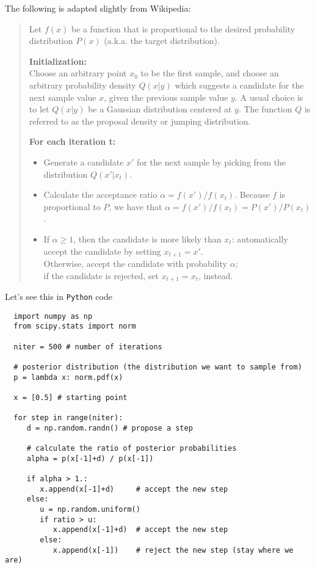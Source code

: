 \documentclass[a4paper,11pt]{article}
\begin{document}
\noindent The following is adapted slightly from Wikipedia:

\begin{quote}
   Let $f(x)$ be a function that is proportional to the desired probability distribution $P(x)$ (a.k.a. the target distribution).

    \textbf{Initialization:}\\
    Choose an arbitrary point $x_0$ to be the first sample, and choose an arbitrary probability density $Q(x|y)$ which suggests a candidate for the next sample value $x$, given the previous sample value $y$. A usual choice is to let $Q(x|y)$ be a Gaussian distribution centered at $y$. The function $Q$ is referred to as the proposal density or jumping distribution.

    \textbf{For each iteration t:}
    \begin{itemize}
      \item Generate a candidate $x'$ for the next sample by picking from the distribution $Q(x'|x_t)$.
      \item Calculate the acceptance ratio $\alpha = f(x')/f(x_t)$. Because $f$ is proportional to $P$, we have that $\alpha = f(x')/f(x_t) = P(x')/P(x_t)$.
      \item If $\alpha \geq 1$, then the candidate is more likely than $x_t$: automatically accept the candidate by setting $x_{t+1} = x'$. \\
      Otherwise, accept the candidate with probability $\alpha$;\\
      if the candidate is rejected, set $x_{t+1} = x_t$, instead.
\end{itemize}
\end{quote}

\noindent Let's see this in \texttt{Python} code


\begin{verbatim}
  import numpy as np
  from scipy.stats import norm
  
  niter = 500 # number of iterations
  
  # posterior distribution (the distribution we want to sample from)
  p = lambda x: norm.pdf(x)
  
  x = [0.5] # starting point
  
  for step in range(niter):
     d = np.random.randn() # propose a step

     # calculate the ratio of posterior probabilities
     alpha = p(x[-1]+d) / p(x[-1])
  
     if alpha > 1.:
        x.append(x[-1]+d)     # accept the new step
     else:
        u = np.random.uniform()
        if ratio > u:
           x.append(x[-1]+d)  # accept the new step
        else:
           x.append(x[-1])    # reject the new step (stay where we are)
\end{verbatim}
\end{document}
